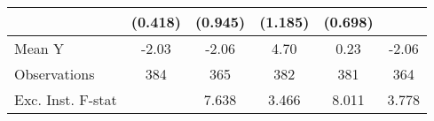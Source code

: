 {\begin{tabular}{l*{5}{c}}
            &     (0.418)         &     (0.945)         &     (1.185)         &     (0.698)         &                     \\
\midrule
Mean Y      &       -2.03         &       -2.06         &        4.70         &        0.23         &       -2.06         \\
Observations&         384         &         365         &         382         &         381         &         364         \\
Exc. Inst. F-stat&                     &       7.638         &       3.466         &       8.011         &       3.778         \\
\bottomrule
\end{tabular}
}
